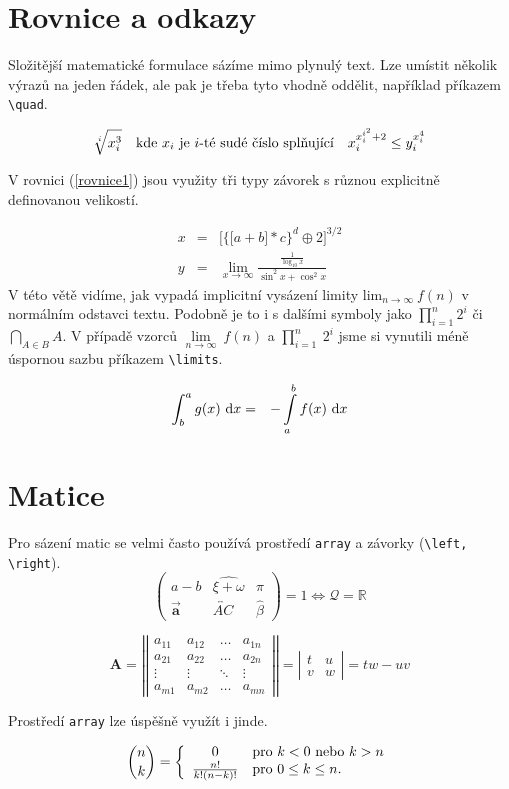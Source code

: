 \documentclass[a4paper,twocolumn,11pt]{article}
\begin{document}
\section{Rovnice a odkazy}
Složitější matematické formulace sázíme mimo plynulý
text. Lze umístit několik výrazů na jeden řádek, ale pak je
třeba tyto vhodně oddělit, například příkazem \verb!\quad!.

$$\sqrt[i]{x_i^3} \quad \textnormal{kde}~x_i~
\textnormal{je}~i\textnormal{-té sudé číslo splňující}\quad x_i^{x_i^{i^2}+2}\leq y_i^{x_i^4}
$$

V rovnici (\ref{rovnice1}) jsou využity tři typy závorek s různou
explicitně definovanou velikostí.

\begin{eqnarray}
\label{rovnice1}
x & = & \bigg[\Big\lbrace\big[a + b\big]* c\Big\rbrace^d\oplus 2\bigg]^{3/2}
\\
y & = & \lim_{x\rightarrow\infty} \frac{\frac{1}{\log_{10}x}}{\sin^2x + \cos^2x}
\nonumber
\end{eqnarray}
V této větě vidíme, jak vypadá implicitní vysázení limity lim$_{n\rightarrow\infty}~f(n)$ v normálním odstavci textu. Podobně
je to i s dalšími symboly jako $\prod_{i=1}^n 2^i$ či $\bigcap_{A\in B}A.$ V případě vzorců $\lim\limits_{ n\rightarrow\infty}~f(n)$ a $\prod\limits_{i=1}^n~2^i$
jsme si vynutili méně úspornou sazbu příkazem \verb!\limits!.

\begin{eqnarray}
\label{rovnice2}
\int_b^a g(x)~\textnormal{d}x & = & - \int\limits_a^b f(x)~\textnormal{d}x
\end{eqnarray}

\section{Matice}
Pro sázení matic se velmi často používá prostředí \texttt{array}
a závorky (\verb!\left, \right!).
$$
\left(\begin{array}{ccc}
    a - b & \widehat{\xi + \omega} & \pi \\
    \Vec{\textbf{a}} & \overleftrightarrow{AC} & \hat\beta
    \end{array}\right) = 1 \Longleftrightarrow \mathcal{Q} = \mathbb{R}$$

$$
\textbf{A} = \left|\left|\begin{array}{cccc}
a_{11} & a_{12} & \dots & a_{1n}\\
a_{21} & a_{22} & \dots & a_{2n}\\
\vdots & \vdots &\ddots & \vdots\\
a_{m1} & a_{m2} & \dots & a_{mn}
\end{array}\right|\right| = \left|
\begin{array}{cc} t & u \\ v & w\end{array}\right|= tw - uv
$$

Prostředí \texttt{array} lze úspěšně využít i jinde.

$$
\binom{n}{k} = \left\{ \begin{array}{c l}
    0 & \textnormal{pro}~k < 0~\textnormal{nebo}~k > n\\
    \frac{n!}{k!(n-k)!} & \textnormal{pro}\ 0 \leq k \leq n.
\end{array}\right.
$$
\end{document}
